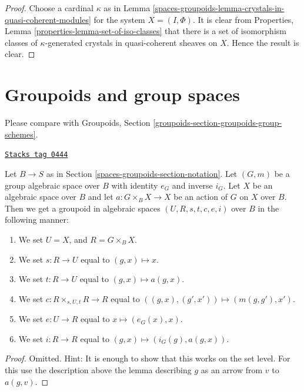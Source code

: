 \begin{proof}
\medskip\noindent
Choose a cardinal $\kappa$ as in
Lemma \ref{spaces-groupoids-lemma-crystals-in-quasi-coherent-modules}
for the system $X = (I, \Phi)$. It is clear from
Properties, Lemma \ref{properties-lemma-set-of-iso-classes}
that there is a set of isomorphism classes of $\kappa$-generated
crystals in quasi-coherent sheaves on $X$.
Hence the result is clear.
\end{proof}

\section{Groupoids and group spaces}
\label{spaces-groupoids-section-groupoids-group-spaces}
Please compare with
Groupoids, Section \ref{groupoids-section-groupoids-group-schemes}.

\begin{lemma}
\label{spaces-groupoids-lemma-groupoid-from-action}
\href{https://stacks.math.columbia.edu/tag/0444}{\texttt{Stacks tag 0444}}

Let $B \to S$ as in Section \ref{spaces-groupoids-section-notation}.
Let $(G, m)$ be a group algebraic space over $B$ with
identity $e_G$ and inverse $i_G$.
Let $X$ be an algebraic space over $B$ and let $a : G \times_B X \to X$
be an action of $G$ on $X$ over $B$.
Then we get a groupoid in algebraic spaces $(U, R, s, t, c, e, i)$ over $B$
in the following manner:
\begin{enumerate}
\item We set $U = X$, and $R = G \times_B X$.
\item We set $s : R \to U$ equal to $(g, x) \mapsto x$.
\item We set $t : R \to U$ equal to $(g, x) \mapsto a(g, x)$.
\item We set $c : R \times_{s, U, t} R \to R$ equal to
$((g, x), (g', x')) \mapsto (m(g, g'), x')$.
\item We set $e : U \to R$ equal to $x \mapsto (e_G(x), x)$.
\item We set $i : R \to R$ equal to $(g, x) \mapsto (i_G(g), a(g, x))$.
\end{enumerate}
\end{lemma}

\begin{proof}
Omitted. Hint: It is enough to show that this works on the set
level. For this use the description above the lemma describing
$g$ as an arrow from $v$ to $a(g, v)$.
\end{proof}

